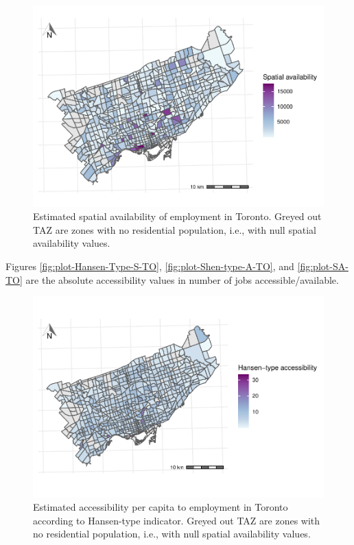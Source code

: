\documentclass[]{elsarticle} %
\begin{document}
\begin{figure}
\includegraphics[width=1\linewidth]{Spatial-Availability-Refreshed_files/figure-latex/absolute-accessibility-plot-V_i-1} \caption{\label{fig:plot-SA-TO}Estimated spatial availability of employment in Toronto. Greyed out TAZ are zones with no residential population, i.e., with null spatial availability values.}\label{fig:absolute-accessibility-plot-V_i}
\end{figure}

Figures \ref{fig:plot-Hansen-Type-S-TO}, \ref{fig:plot-Shen-type-A-TO},
and \ref{fig:plot-SA-TO} are the absolute accessibility values in number
of jobs accessible/available.

\begin{figure}
\includegraphics[width=1\linewidth]{Spatial-Availability-Refreshed_files/figure-latex/per-capita-accessibility-plot-s_i-1} \caption{\label{fig:plot-Hansen-Type-S-TO}Estimated accessibility per capita to employment in Toronto according to Hansen-type indicator. Greyed out TAZ are zones with no residential population, i.e., with null spatial availability values.}\label{fig:per-capita-accessibility-plot-s_i}
\end{figure}
\end{document}
